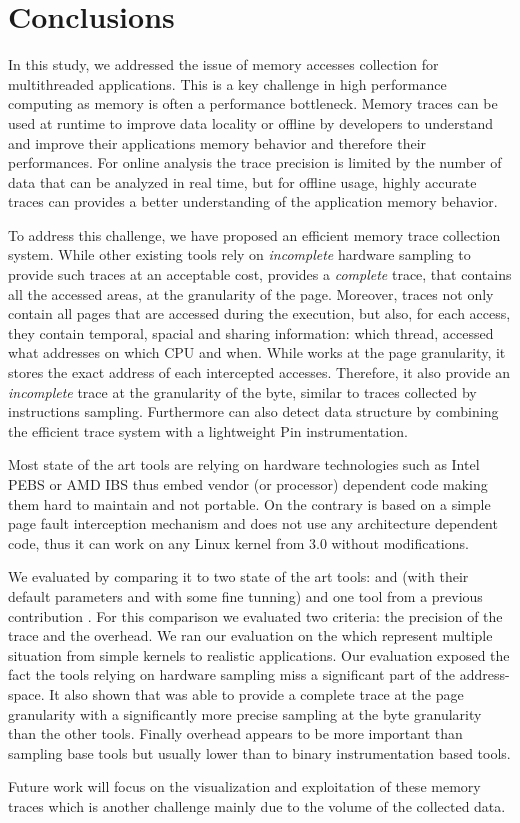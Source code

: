 \section{Conclusions}
\label{sec:cncl}

In this study, we addressed the issue of memory accesses collection for
multithreaded applications. This is a key challenge in high performance
computing as memory is often a performance
bottleneck. Memory traces can be used at runtime to improve data locality or
offline by developers to understand and improve their applications memory
behavior and therefore their performances. For online analysis the trace precision
is limited by the number of data that can be analyzed in real time, but for
offline usage, highly accurate traces can provides a better understanding of
the application memory behavior.

To address this challenge, we have proposed \Moca an efficient memory trace
collection system. While other existing tools
rely on \emph{incomplete} hardware sampling to
provide such traces at an acceptable cost, \Moca provides a \emph{complete}
trace, that contains all the accessed areas, at the granularity of the page.
Moreover, \Moca traces not only
contain all pages that are accessed during the execution, but also, 
for each access, they contain temporal, spacial and sharing
information: which thread, accessed what addresses on which CPU and when.
While \Moca works at the page granularity, it stores the exact
address of each intercepted accesses. Therefore, it also provide an
\emph{incomplete} trace at the granularity of the byte, similar to
traces collected by instructions sampling. Furthermore \Moca can also detect
data structure by combining the efficient trace system with a lightweight Pin
instrumentation.

Most state of the art tools are relying on hardware technologies such as Intel PEBS
or AMD IBS thus embed vendor (or processor) dependent code making them hard
to maintain and not portable. On the contrary \Moca is based on a simple page
fault interception mechanism and does not use any architecture dependent code,
thus it can work on any Linux kernel from $3.0$ without modifications.

We evaluated \Moca by comparing it to two state of the art tools: \Mitos and
\MemProf (with their default parameters and with some fine tunning) and one
tool from a previous contribution \TABARNAC. For this comparison we evaluated
two criteria: the precision of the trace and the overhead. We ran our
evaluation on the \NPB which represent multiple situation from simple kernels
to realistic applications. Our evaluation exposed the fact the tools
relying on hardware sampling miss a significant part of the address-space. It
also shown that \Moca was able to provide a complete trace at the page
granularity with a significantly more precise sampling at the byte granularity than the
other tools. Finally \Moca overhead appears to be more important than sampling
base tools but usually lower than to binary instrumentation  based tools.

Future work will focus on the visualization and exploitation of these memory traces
which is another challenge mainly due to the volume of the collected data.
